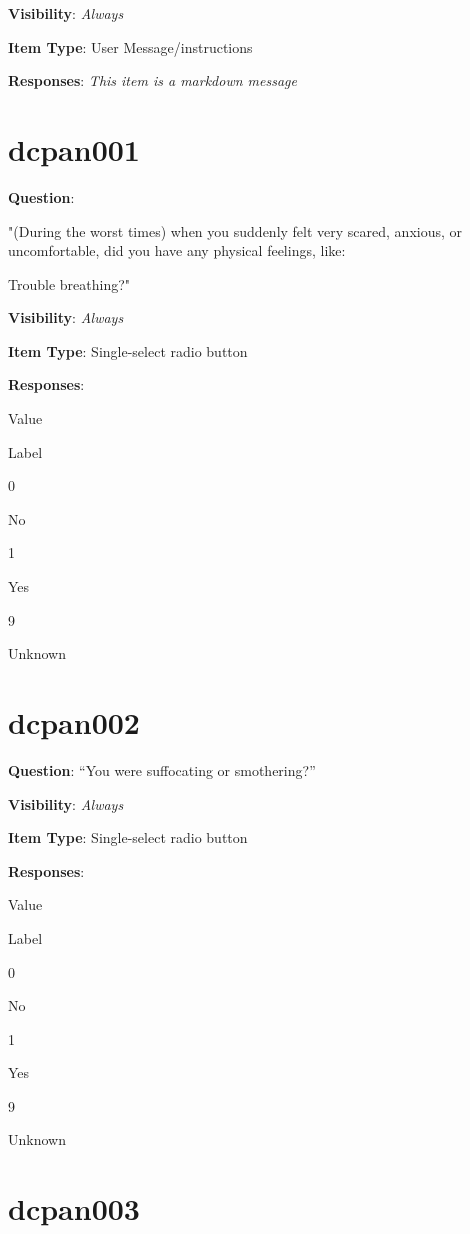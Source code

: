 \documentclass[]{book}
\begin{document}
\textbf{Visibility}: \emph{Always}

\textbf{Item Type}: User Message/instructions

\textbf{Responses}: \emph{This item is a markdown message}

\hypertarget{dcpan001}{%
\section{dcpan001}\label{dcpan001}}

\textbf{Question}:

"(During the worst times) when you suddenly felt very scared, anxious, or uncomfortable, did you have any physical feelings, like:

Trouble breathing?"

\textbf{Visibility}: \emph{Always}

\textbf{Item Type}: Single-select radio button

\textbf{Responses}:

Value

Label

0

No

1

Yes

9

Unknown

\hypertarget{dcpan002}{%
\section{dcpan002}\label{dcpan002}}

\textbf{Question}: ``You were suffocating or smothering?''

\textbf{Visibility}: \emph{Always}

\textbf{Item Type}: Single-select radio button

\textbf{Responses}:

Value

Label

0

No

1

Yes

9

Unknown

\hypertarget{dcpan003}{%
\section{dcpan003}\label{dcpan003}}
\end{document}
